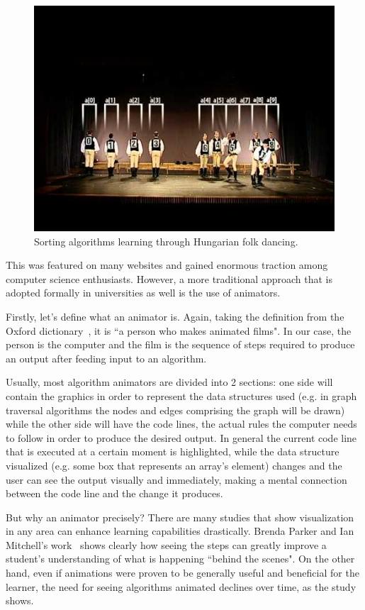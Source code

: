 \documentclass{l4proj}
\begin{document}
\begin{figure}[!ht]
\centering
\includegraphics[scale=0.6]{quicksort}
\caption{Sorting algorithms learning through Hungarian folk dancing.}
\label{fig:quicksort}
\end{figure}

This was featured on many websites and gained enormous traction among computer science enthusiasts. However, a more traditional approach that is adopted formally in universities as well is the use of animators.

Firstly, let's define what an animator is. Again, taking the definition from the Oxford dictionary~\cite{oxford-dict},
it is ``a person who makes animated films". In our case, the person is the computer and the film is the sequence of steps required to produce an output after feeding input to an algorithm.

Usually, most algorithm animators are divided into 2 sections: one side will contain the graphics in order to represent the data structures used (e.g. in graph traversal algorithms the nodes and edges comprising the graph will be drawn) while the other side will have the code lines, the actual rules the computer needs to follow in order to produce the desired output. In general the current code line that is executed at a certain moment is highlighted, while the data structure visualized (e.g. some box that represents an array's element) changes and the user can see the output visually and immediately, making a mental connection between the code line and the change it produces.

But why an animator precisely? There are many studies that show visualization in any area can enhance learning
capabilities drastically. Brenda Parker and Ian Mitchell's work~\cite{parker-mitchell} shows clearly how seeing the
steps can greatly improve a student's understanding of what is happening ``behind the scenes". On the other hand, even if animations were proven to be generally useful and beneficial for the learner, the need for seeing algorithms animated declines over time, as the study shows.
\end{document}
